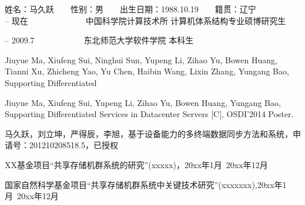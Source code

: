 \begin{resume}

\noindent
姓名：马久跃　　性别：男　　出生日期：1988.10.19　　籍贯：辽宁\\

 -- 现在　　　　　　　中国科学院计算技术所 计算机体系结构专业硕博研究生

 -- 2009.7　　　　　　东北师范大学软件学院 本科生\\

  \begin{enumerate}[{[}1{]}]
  \item Jiuyue Ma, Xiufeng Sui, Ninghui Sun, Yupeng Li, Zihao Yu, Bowen Huang, Tianni Xu, Zhicheng Yao, Yu Chen, Haibin Wang, Lixin Zhang, Yungang Bao, Supporting Differentiated
  \item Jiuyue Ma, Xiufeng Sui, Yupeng Li, Zihao Yu, Bowen Huang, Yungang Bao, Supporting Differentiated Services in Datacenter Servers [C], OSDI'2014 Poster.
  \end{enumerate}

  \begin{enumerate}[{[}1{]}]
  \item 马久跃，刘立坤，严得辰，李旭，基于设备能力的多终端数据同步方法和系统，申请号：201210208518.5，已授权
  \end{enumerate}

  \begin{enumerate}[{[}1{]}]
  \item XX基金项目“共享存储机群系统的研究”(xxxxx)，20xx年1月~20xx年12月
  \item 国家自然科学基金项目“共享存储机群系统中关键技术研究”(xxxxxxx),20xx年1月~20xx年12月
  \end{enumerate}

\end{resume}
